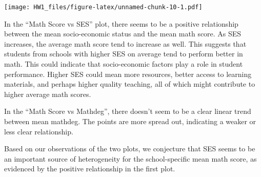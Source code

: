 \documentclass[
]{article}
\newenvironment{Shaded}{\begin{snugshade}}{\end{snugshade}}
\newcommand{\AttributeTok}[1]{\textcolor[rgb]{0.13,0.29,0.53}{#1}}
\newcommand{\DecValTok}[1]{\textcolor[rgb]{0.00,0.00,0.81}{#1}}
\newcommand{\FunctionTok}[1]{\textcolor[rgb]{0.13,0.29,0.53}{\textbf{#1}}}
\newcommand{\NormalTok}[1]{#1}
\newcommand{\OtherTok}[1]{\textcolor[rgb]{0.56,0.35,0.01}{#1}}
\newcommand{\SpecialCharTok}[1]{\textcolor[rgb]{0.81,0.36,0.00}{\textbf{#1}}}
\newcommand{\StringTok}[1]{\textcolor[rgb]{0.31,0.60,0.02}{#1}}
\begin{document}
\begin{Shaded}
\end{Shaded}

\texttt{[image: HW1\_files/figure-latex/unnamed-chunk-10-1.pdf]}

In the ``Math Score vs SES'' plot, there seems to be a positive
relationship between the mean socio-economic status and the mean math
score. As SES increases, the average math score tend to increase as
well. This suggests that students from schools with higher SES on
average tend to perform better in math. This could indicate that
socio-economic factors play a role in student performance. Higher SES
could mean more resources, better access to learning materials, and
perhaps higher quality teaching, all of which might contribute to higher
average math scores.

In the ``Math Score vs Mathdeg'', there doesn't seem to be a clear
linear trend between mean mathdeg. The points are more spread out,
indicating a weaker or less clear relationship.

Based on our observations of the two plots, we conjecture that SES seems
to be an important source of heterogeneity for the school-specific mean
math score, as evidenced by the positive relationship in the first plot.
\end{document}
